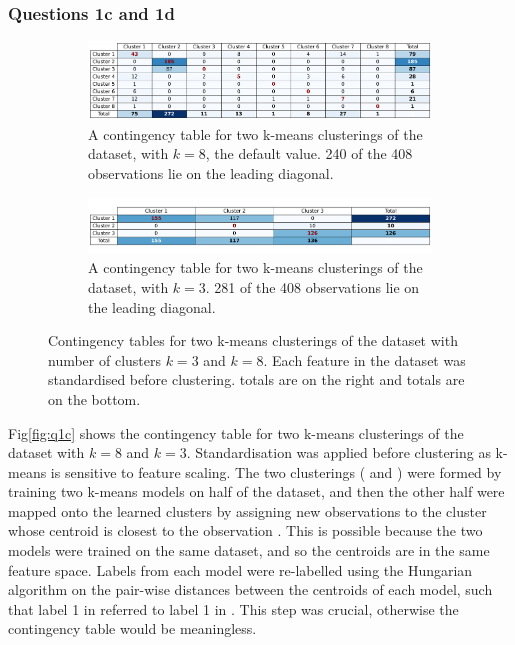 \subsubsection{Questions 1c and 1d}\label{subsubsec:q1cd}
    \begin{figure}[htb]
    \centering
    \begin{subfigure}[b]{0.9\linewidth}
        \includegraphics[width=1\textwidth]{./figures/q1c}
        \caption{A contingency table for two k-means clusterings of the  dataset, with $k=8$,
            the default  value. 240 of the 408 observations lie on the leading diagonal.}
        \label{fig:q1c}
    \end{subfigure}
    \hfill
    \begin{subfigure}[b]{0.9\linewidth}
        \includegraphics[width=1\textwidth]{./figures/q1d}
        \caption{A contingency table for two k-means clusterings of the  dataset, with $k=3$.
            281 of the 408 observations lie on the leading diagonal.}
        \label{fig:q1d}
    \end{subfigure}
    \caption{Contingency tables for two k-means clusterings of the  dataset with number of
        clusters $k=3$ and $k=8$.
        Each feature in the dataset was standardised before clustering.
         totals are on the right and  totals are on the bottom.}
    \label{fig:q1cd}
    \end{figure}

    Fig\eqref{fig:q1c} shows the contingency table for two k-means clusterings of the dataset with $k=8$ and $k=3$.
    Standardisation was applied before clustering as k-means is sensitive to feature scaling.
    The two clusterings ( and ) were formed by training two k-means models on
    half of the dataset, and then the other half were mapped onto the learned clusters by assigning new observations
    to the cluster whose centroid is closest to the observation \cite{sklearn-k-means}.
    This is possible because the two models were trained on the same dataset, and so the centroids are in the same
    feature space.
    Labels from each model were re-labelled using the Hungarian algorithm \cite{scipy-linsumopt} \cite{assignment-problem} on
    the pair-wise distances between the centroids of each model, such that label 1 in  referred to
    label 1 in
    .
    This step was crucial, otherwise the contingency table would be meaningless.


